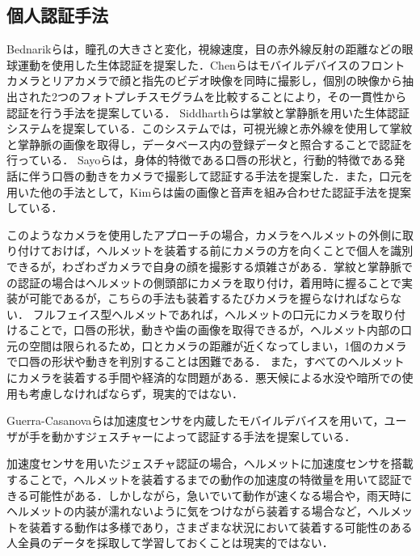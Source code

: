 \documentclass[Japanese,noauthor]{dicomopapers}
\begin{document}
\subsection{個人認証手法}
Bednarikら\cite{eye_movement}は，瞳孔の大きさと変化，視線速度，目の赤外線反射の距離などの眼球運動を使用した生体認証を提案した．Chenら\cite{face_and_finger}はモバイルデバイスのフロントカメラとリアカメラで顔と指先のビデオ映像を同時に撮影し，個別の映像から抽出された2つのフォトプレチスモグラムを比較することにより，その一貫性から認証を行う手法を提案している．
Siddharthら\cite{palm_print}は掌紋と掌静脈を用いた生体認証システムを提案している．このシステムでは，可視光線と赤外線を使用して掌紋と掌静脈の画像を取得し，データベース内の登録データと照合することで認証を行っている．
Sayoら\cite{lip_motion}は，身体的特徴である口唇の形状と，行動的特徴である発話に伴う口唇の動きをカメラで撮影して認証する手法を提案した．また，口元を用いた他の手法として，Kimら\cite{teeth_and_voice}は歯の画像と音声を組み合わせた認証手法を提案している．\par

このようなカメラを使用したアプローチの場合，カメラをヘルメットの外側に取り付けておけば，ヘルメットを装着する前にカメラの方を向くことで個人を識別できるが，わざわざカメラで自身の顔を撮影する煩雑さがある．掌紋と掌静脈での認証の場合はヘルメットの側頭部にカメラを取り付け，着用時に握ることで実装が可能であるが，こちらの手法も装着するたびカメラを握らなければならない．
フルフェイス型ヘルメットであれば，ヘルメットの口元にカメラを取り付けることで，口唇の形状，動きや歯の画像を取得できるが，ヘルメット内部の口元の空間は限られるため，口とカメラの距離が近くなってしまい，1個のカメラで口唇の形状や動きを判別することは困難である．
また，すべてのヘルメットにカメラを装着する手間や経済的な問題がある．悪天候による水没や暗所での使用も考慮しなければならず，現実的ではない．\par

Guerra-Casanovaら\cite{accelerometer_authentification}は加速度センサを内蔵したモバイルデバイスを用いて，ユーザが手を動かすジェスチャーによって認証する手法を提案している．

加速度センサを用いたジェスチャ認証の場合，ヘルメットに加速度センサを搭載することで，ヘルメットを装着するまでの動作の加速度の特徴量を用いて認証できる可能性がある．しかしながら，急いでいて動作が速くなる場合や，雨天時にヘルメットの内装が濡れないように気をつけながら装着する場合など，ヘルメットを装着する動作は多様であり，さまざまな状況において装着する可能性のある人全員のデータを採取して学習しておくことは現実的ではない．\par
\end{document}
